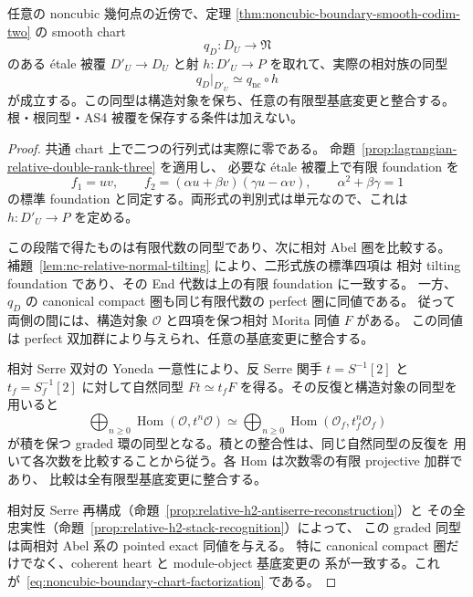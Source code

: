 \begin{lemma}
\label{lem:noncubic-boundary-chart-factorization}
任意の noncubic 幾何点の近傍で、定理
\ref{thm:noncubic-boundary-smooth-codim-two} の smooth chart
\[
 q_D:D_U\longrightarrow\mathfrak N
\]
のある \texorpdfstring{\'etale}{etale} 被覆 $D'_U\to D_U$ と射
$h:D'_U\to P$ を取れて、実際の相対族の同型
\[
 q_D|_{D'_U}\simeq q_{\mathrm{nc}}\circ h
 \tag{NC-chart-factor}\label{eq:noncubic-boundary-chart-factorization}
\]
が成立する。この同型は構造対象を保ち、任意の有限型基底変更と整合する。
根・根同型・AS4 被覆を保存する条件は加えない。
\end{lemma}
\begin{proof}
共通 chart 上で二つの行列式は実際に零である。
命題~\ref{prop:lagrangian-relative-double-rank-three} を適用し、
必要な \texorpdfstring{\'etale}{etale} 被覆上で有限 foundation を
\[
 f_1=uv,\qquad f_2=(\alpha u+\beta v)(\gamma u-\alpha v),
 \qquad\alpha^2+\beta\gamma=1
\]
の標準 foundation と同定する。両形式の判別式は単元なので、これは
$h:D'_U\to P$ を定める。

この段階で得たものは有限代数の同型であり、次に相対 Abel 圏を比較する。
補題~\ref{lem:nc-relative-normal-tilting} により、二形式族の標準四項は
相対 tilting foundation であり、その End 代数は上の有限 foundation に一致する。
一方、$q_D$ の canonical compact 圏も同じ有限代数の perfect 圏に同値である。
従って両側の間には、構造対象 $\mathcal O$ と四項を保つ相対 Morita 同値 $F$ がある。
この同値は perfect 双加群により与えられ、任意の基底変更に整合する。

相対 Serre 双対の Yoneda 一意性により、反 Serre 関手
$t=S^{-1}[2]$ と $t_f=S_f^{-1}[2]$ に対して自然同型
$Ft\simeq t_fF$ を得る。その反復と構造対象の同型を用いると
\[
 \bigoplus_{n\ge0}\operatorname{Hom}(\mathcal O,t^n\mathcal O)
 \simeq
 \bigoplus_{n\ge0}\operatorname{Hom}(\mathcal O_f,t_f^n\mathcal O_f)
\]
が積を保つ graded 環の同型となる。積との整合性は、同じ自然同型の反復を
用いて各次数を比較することから従う。各 Hom は次数零の有限 projective 加群であり、
比較は全有限型基底変更に整合する。

相対反 Serre 再構成（命題~\ref{prop:relative-h2-antiserre-reconstruction}）と
その全忠実性（命題~\ref{prop:relative-h2-stack-recognition}）によって、
この graded 同型は両相対 Abel 系の pointed exact 同値を与える。
特に canonical compact 圏だけでなく、coherent heart と module-object 基底変更の
系が一致する。これが~\eqref{eq:noncubic-boundary-chart-factorization} である。
\end{proof}

